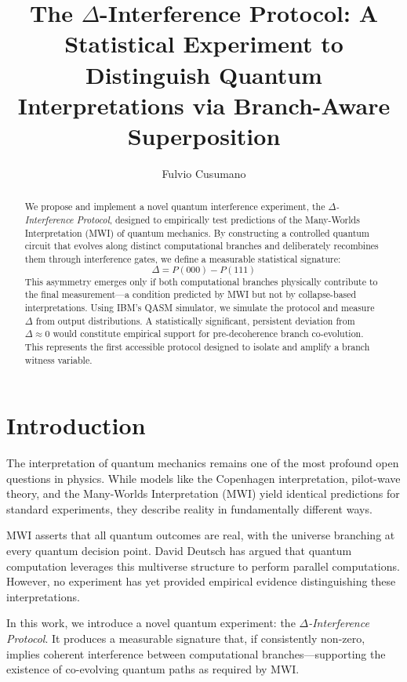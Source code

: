 \documentclass[12pt]{article}
\title{\textbf{The $\Delta$-Interference Protocol: A Statistical Experiment to Distinguish Quantum Interpretations via Branch-Aware Superposition}}
\author{Fulvio Cusumano}
\date{}
\begin{document}
\maketitle

\begin{abstract}
We propose and implement a novel quantum interference experiment, the \textit{$\Delta$-Interference Protocol}, designed to empirically test predictions of the Many-Worlds Interpretation (MWI) of quantum mechanics. By constructing a controlled quantum circuit that evolves along distinct computational branches and deliberately recombines them through interference gates, we define a measurable statistical signature:
\[
\Delta = P(000) - P(111)
\]
This asymmetry emerges only if both computational branches physically contribute to the final measurement---a condition predicted by MWI but not by collapse-based interpretations. Using IBM’s QASM simulator, we simulate the protocol and measure $\Delta$ from output distributions. A statistically significant, persistent deviation from $\Delta \approx 0$ would constitute empirical support for pre-decoherence branch co-evolution. This represents the first accessible protocol designed to isolate and amplify a branch witness variable.
\end{abstract}

\section{Introduction}
The interpretation of quantum mechanics remains one of the most profound open questions in physics. While models like the Copenhagen interpretation, pilot-wave theory, and the Many-Worlds Interpretation (MWI) yield identical predictions for standard experiments, they describe reality in fundamentally different ways.

MWI asserts that all quantum outcomes are real, with the universe branching at every quantum decision point. David Deutsch has argued that quantum computation leverages this multiverse structure to perform parallel computations. However, no experiment has yet provided empirical evidence distinguishing these interpretations.

In this work, we introduce a novel quantum experiment: the \textit{$\Delta$-Interference Protocol}. It produces a measurable signature that, if consistently non-zero, implies coherent interference between computational branches---supporting the existence of co-evolving quantum paths as required by MWI.
\end{document}
